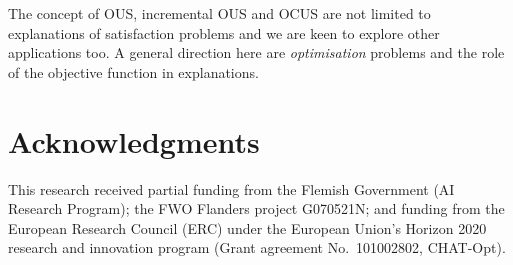 The concept of OUS, incremental OUS and OCUS are not limited to explanations of satisfaction problems and we are keen to explore other applications too.
A general direction here are \textit{optimisation} problems and the role of the objective function in explanations.
%

\section*{Acknowledgments}
This research received partial funding
from the Flemish Government (AI Research Program); the FWO Flanders project G070521N; and funding from the European Research Council (ERC) under the European Union’s Horizon 2020 research and innovation program (Grant agreement No.~101002802, CHAT-Opt).
